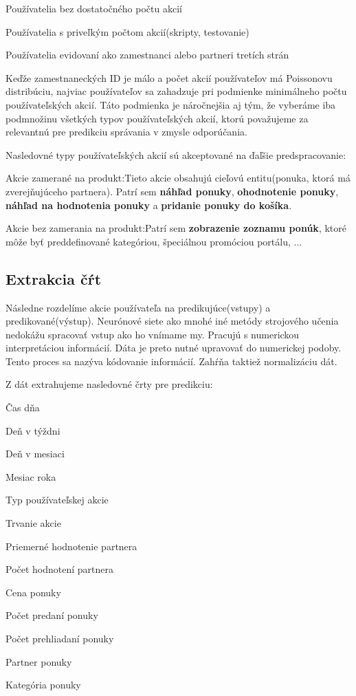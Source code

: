 \begin{my_itemize}
	\item{Používatelia bez dostatočného počtu akcií}
	\item{Používatelia s priveľkým počtom akcií(skripty, testovanie)}
	\item{Používatelia evidovaní ako zamestnanci alebo partneri tretích strán}
\end{my_itemize}

Keďže zamestnaneckých ID je málo a počet akcií používateľov má Poissonovu distribúciu, najviac používateľov sa zahadzuje pri podmienke minimálneho počtu používateľských akcií. Táto podmienka je náročnejšia aj tým, že vyberáme iba podmnožinu všetkých typov používateľských akcií, ktorú považujeme za relevantnú pre predikciu správania v zmysle odporúčania.

Nasledovné typy používateľských akcií sú akceptované na ďaľšie predspracovanie:
\begin{my_itemize}
	\item {Akcie zamerané na produkt:}\newline Tieto akcie obsahujú cieľovú entitu(ponuka, ktorá má zverejňujúceho partnera). Patrí sem \textbf{náhľad ponuky}, \textbf{ohodnotenie ponuky}, \textbf{náhľad na hodnotenia ponuky} a \textbf{pridanie ponuky do košíka}.
	\item {Akcie bez zamerania na produkt:}\newline Patrí sem \textbf{zobrazenie zoznamu ponúk}, ktoré môže byť preddefinované kategóriou, špeciálnou promóciou portálu, ...
\end{my_itemize}

\subsection{Extrakcia čŕt}
Následne rozdelíme akcie používateľa na predikujúce(vstupy) a predikované(výstup). Neurónové siete ako mnohé iné metódy strojového učenia nedokážu spracovať vstup ako ho vnímame my. Pracujú s numerickou interpretáciou informácií. Dáta je preto nutné upravovať do numerickej podoby. Tento proces sa nazýva kódovanie informácií. Zahŕňa taktiež normalizáciu dát.

 Z dát extrahujeme nasledovné črty pre predikciu:
 
 \begin{my_itemize}
 	\item Čas dňa
 	\item Deň v týždni
 	\item Deň v mesiaci
 	\item Mesiac roka
 	\item Typ používateľskej akcie
 	\item Trvanie akcie
 	\item Priemerné hodnotenie partnera
 	\item Počet hodnotení partnera
 	\item Cena ponuky
 	\item Počet predaní ponuky
 	\item Počet prehliadaní ponuky
 	\item Partner ponuky
 	\item Kategória ponuky
 \end{my_itemize}
 
